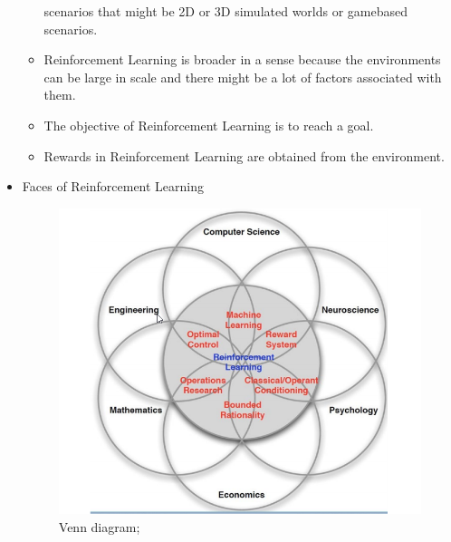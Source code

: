\documentclass[14pt,a4paper]{report}  %
\begin{document}
\begin{itemize}
\begin{itemize}
scenarios that might be 2D or 3D simulated worlds or gamebased scenarios.
\end{itemize}
\begin{itemize}
\item Reinforcement Learning is broader in a sense because the
environments can be large in scale and there might be a lot of
factors associated with them.
\end{itemize}
\begin{itemize}
\item The objective of Reinforcement Learning is to reach a goal.
\end{itemize}
\begin{itemize}
\item Rewards in Reinforcement Learning are obtained from the
environment.
\end{itemize}
\item Faces of Reinforcement Learning\\
\begin{figure}[hbt!]
\begin{center}
\includegraphics[scale=0.74]{Faces_of_Reinforcement_Learning}
\caption{Venn diagram; }%
\end{center}
\end{figure}

\end{itemize}
\end{document}
